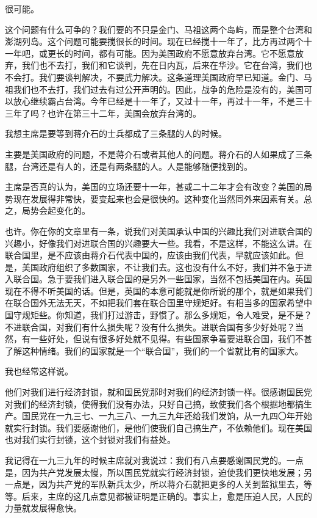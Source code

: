 很可能。

这个问题有什么可争的？我们要的不只是金门、马祖这两个岛屿，而是整个台湾和澎湖列岛。这个问题可能要搅很长的时间。现在已经搅十一年了，比方再过两个十一年吧，或更长的时间，都有可能。因为美国政府不愿意放弃台湾。它不愿意放弃，我们也不去打，我们和它谈判，先在日内瓦，后来在华沙。它在台湾，我们也不会打。我们要谈判解决，不要武力解决。这条道理美国政府早已知道。金门、马祖我们也不去打，我们过去有过公开声明的。因此，战争的危险是没有的，美国可以放心继续霸占台湾。今年已经是十一年了，又过十一年，再过十一年，不是三十三年了吗？也许在第三十二年，美国会放弃台湾的。

我想主席是要等到蒋介石的士兵都成了三条腿的人的时候。

主要是美国政府的问题，不是蒋介石或者其他人的问题。蒋介石的人如果成了三条腿，台湾还是有人的，还是有两条腿的人。人是能够随便找到的。

主席是否真的认为，美国的立场还要十一年，甚或二十二年才会有改变？美国的局势现在发展得非常快，要变起来也会是很快的。这种变化当然同外来因素有关。总之，局势会起变化的。

也许。你在你的文章里有一条，说我们对美国承认中国的兴趣比我们对进联合国的兴趣小，好像我们对进联合国的兴趣要大一些。我看，不是这样，不能这么讲。在联合国里，是不应该由蒋介石代表中国的，应该由我们代表，早就应该如此。但是，美国政府组织了多数国家，不让我们去。这也没有什么不好，我们并不急于进入联合国。急于要我们进入联合国的是另外一些国家，当然不包括美国在内。英国现在不得不听美国的话。但是，英国的本意可能就是你所说的那个，就是如果我们在联合国外无法无天，不如把我们套在联合国里守规矩好。有相当多的国家希望中国守规矩些。你知道，我们打过游击，野惯了。那么多规矩，令人难受，是不是？不进联合国，对我们有什么损失呢？没有什么损失。进联合国有多少好处呢？当然，有一些好处，但说有很多好处就不见得。有些国家争着要进联合国，我们不甚了解这种情绪。我们的国家就是一个“联合国”，我们的一个省就比有的国家大。

我也经常这样说。

他们对我们进行经济封锁，就和国民党那时对我们的经济封锁一样。很感谢国民党对我们的经济封锁，使得我们没有办法，只好自己搞，致使我们各个根据地都搞生产。国民党在一九三七、一九三八、一九三九年还给我们发饷，从一九四〇年开始就实行封锁。我们要感谢他们，是他们使我们自己搞生产，不依赖他们。现在美国也对我们实行封锁，这个封锁对我们有益处。

我记得在一九三九年的时候主席就对我说过：我们有八点要感谢国民党的。一点是，因为共产党发展太慢，所以国民党就实行经济封锁，迫使我们更快地发展；另一点是，因为共产党的军队新兵太少，所以蒋介石就把更多的人关到监狱里去，等等。后来，主席的这几点意见都被证明是正确的。事实上，愈是压迫人民，人民的力量就发展得愈快。

